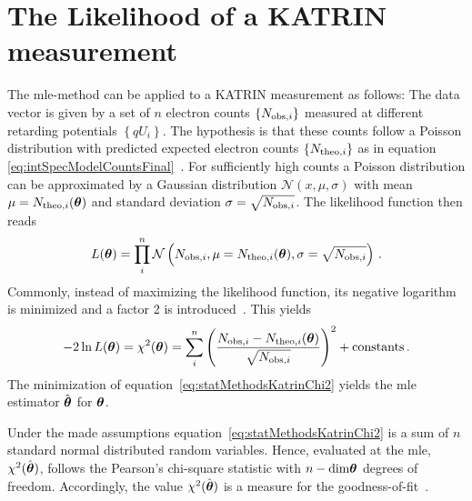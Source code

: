 \section{The Likelihood of a KATRIN measurement}
\label{sec:statMethodsKATRINLikelihood}
The \gls{mle}-method can be applied to a KATRIN measurement as follows: The data vector is given by a set of $n$ electron counts $\left\{N_{\mathrm{obs,}i}\right\}$ measured at different retarding potentials $\left\{qU_i\right\}$. The hypothesis is that these counts follow a Poisson distribution with predicted expected electron counts $\left\{N_{\mathrm{theo,}i}\right\}$ as in equation \eqref{eq:intSpecModelCountsFinal}~\cite{Kleesiek2014}. For sufficiently high counts a Poisson distribution can be approximated by a Gaussian distribution $\mathcal{N}(x,\mu, \sigma)$ with mean $\mu=N_{\mathrm{theo,}i}(\boldsymbol{\mathbf{\theta}})$ and standard deviation $\sigma=\sqrt{N_{\mathrm{obs,}i}}$.  The likelihood function then reads
\begin{equation}
	\label{eq:KATRINlikelihood}
	L(\boldsymbol{\mathbf{\theta}}) = \prod_{i}^{n} \mathcal{N}\left(N_{\mathrm{obs,}i},\mu=N_{\mathrm{theo,}i}(\boldsymbol{\mathbf{\theta}}), \sigma=\sqrt{N_{\mathrm{obs,}i}}\right)
	\text{\,.}
\end{equation}
Commonly, instead of maximizing the likelihood function, its negative logarithm is minimized and a factor 2 is introduced~\cite{ReviewOfParticlePhysics}. This yields
\begin{equation}
	\label{eq:statMethodsKatrinChi2}
	-2\ln L(\boldsymbol{\mathbf{\theta}}) = \chi^2(\boldsymbol{\mathbf{\theta}}) = \sum_i^n
		\left( 
			\frac{N_{\mathrm{obs,}i}-N_{\mathrm{theo,}i}(\boldsymbol{\mathbf{\theta}})}{\sqrt{N_{\mathrm{obs,}i}}}
		\right)^2
		 + \mathrm{constants}
		\text{\,.}
\end{equation}
The minimization of equation~\eqref{eq:statMethodsKatrinChi2} yields the \gls{mle} estimator $\hat{\boldsymbol{\mathbf{\theta}}}$ for $\boldsymbol{\mathbf{\theta}}$.

Under the made assumptions equation~\eqref{eq:statMethodsKatrinChi2} is a sum of $n$ standard normal distributed random variables. Hence, evaluated at the \gls{mle},  $\chi^2(\hat{\boldsymbol{\mathbf{\theta}}})$, follows the Pearson's chi-square statistic with $n-\mathrm{dim}\boldsymbol{\mathbf{\theta}}$ degrees of freedom. Accordingly, the value $\chi^2(\hat{\boldsymbol{\mathbf{\theta}}})$ is a measure for the goodness-of-fit~\cite{ReviewOfParticlePhysics}.

